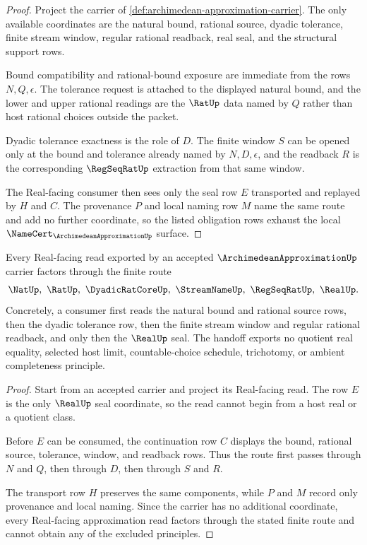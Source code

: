 \begin{proof}
Project the carrier of \autoref{def:archimedean-approximation-carrier}. The
only available coordinates are the natural bound, rational source, dyadic
tolerance, finite stream window, regular rational readback, real seal, and the
structural support rows.

Bound compatibility and rational-bound exposure are immediate from the rows
$N,Q,\epsilon$. The tolerance request is attached to the displayed natural
bound, and the lower and upper rational readings are the $\RatUp$ data named
by $Q$ rather than host rational choices outside the packet.

Dyadic tolerance exactness is the role of $D$. The finite window $S$ can be
opened only at the bound and tolerance already named by $N,D,\epsilon$, and
the readback $R$ is the corresponding $\RegSeqRatUp$ extraction from that same
window.

The Real-facing consumer then sees only the seal row $E$ transported and
replayed by $H$ and $C$. The provenance $P$ and local naming row $M$ name the
same route and add no further coordinate, so the listed obligation rows
exhaust the local $\NameCert_{\ArchimedeanApproximationUp}$ surface.
\end{proof}

\begin{theorem}
\label{thm:archimedean-approximation-real-seal-handoff}
Every Real-facing read exported by an accepted $\ArchimedeanApproximationUp$
carrier factors through the finite route
$$
\NatUp,\ \RatUp,\ \DyadicRatCoreUp,\ \StreamNameUp,\ \RegSeqRatUp,\ \RealUp .
$$
Concretely, a consumer first reads the natural bound and rational source rows,
then the dyadic tolerance row, then the finite stream window and regular
rational readback, and only then the $\RealUp$ seal. The handoff exports no
quotient real equality, selected host limit, countable-choice schedule,
trichotomy, or ambient completeness principle.
\end{theorem}
\begin{proof}
Start from an accepted carrier and project its Real-facing read. The row $E$
is the only $\RealUp$ seal coordinate, so the read cannot begin from a host
real or a quotient class.

Before $E$ can be consumed, the continuation row $C$ displays the bound,
rational source, tolerance, window, and readback rows. Thus the route first
passes through $N$ and $Q$, then through $D$, then through $S$ and $R$.

The transport row $H$ preserves the same components, while $P$ and $M$ record
only provenance and local naming. Since the carrier has no additional
coordinate, every Real-facing approximation read factors through the stated
finite route and cannot obtain any of the excluded principles.
\end{proof}

